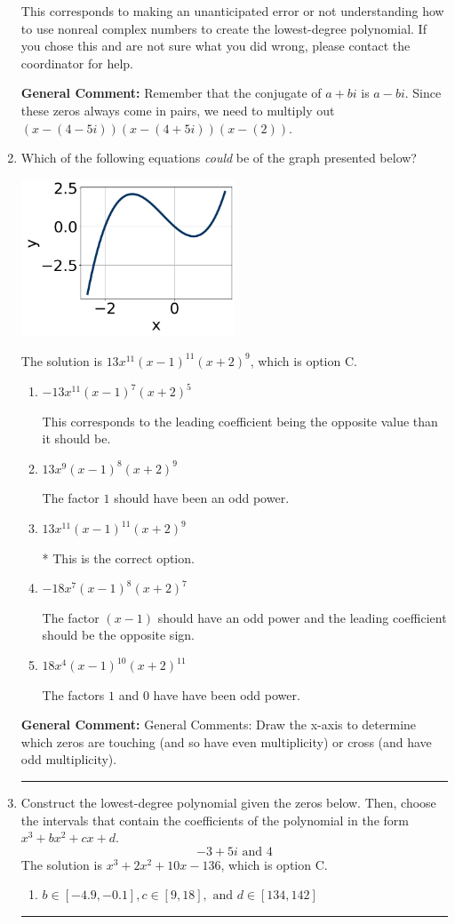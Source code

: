 \documentclass{extbook}[14pt]
\newcommand{\litem}[1]{\item #1

\rule{\textwidth}{0.4pt}}
\begin{document}
\begin{enumerate}
{\begin{enumerate}[label=\Alph*.]
This corresponds to making an unanticipated error or not understanding how to use nonreal complex numbers to create the lowest-degree polynomial. If you chose this and are not sure what you did wrong, please contact the coordinator for help.
\end{enumerate}

\textbf{General Comment:} Remember that the conjugate of $a+bi$ is $a-bi$. Since these zeros always come in pairs, we need to multiply out $(x-(4 - 5 i))(x-(4 + 5 i))(x-(2))$.
}
\litem{
Which of the following equations \textit{could} be of the graph presented below?

\begin{center}
    \includegraphics[width=0.5\textwidth]{../Figures/polyGraphToFunctionA.png}
\end{center}


The solution is \( 13x^{11} (x - 1)^{11} (x + 2)^{9} \), which is option C.\begin{enumerate}[label=\Alph*.]
\item \( -13x^{11} (x - 1)^{7} (x + 2)^{5} \)

This corresponds to the leading coefficient being the opposite value than it should be.
\item \( 13x^{9} (x - 1)^{8} (x + 2)^{9} \)

The factor $1$ should have been an odd power.
\item \( 13x^{11} (x - 1)^{11} (x + 2)^{9} \)

* This is the correct option.
\item \( -18x^{7} (x - 1)^{8} (x + 2)^{7} \)

The factor $(x - 1)$ should have an odd power and the leading coefficient should be the opposite sign.
\item \( 18x^{4} (x - 1)^{10} (x + 2)^{11} \)

The factors $1$ and $0$ have have been odd power.
\end{enumerate}

\textbf{General Comment:} General Comments: Draw the x-axis to determine which zeros are touching (and so have even multiplicity) or cross (and have odd multiplicity).
}
\litem{
Construct the lowest-degree polynomial given the zeros below. Then, choose the intervals that contain the coefficients of the polynomial in the form $x^3+bx^2+cx+d$.
\[ -3 + 5 i \text{ and } 4 \]The solution is \( x^{3} +2 x^{2} +10 x -136 \), which is option C.\begin{enumerate}[label=\Alph*.]
\item \( b \in [-4.9, -0.1], c \in [9, 18], \text{ and } d \in [134, 142] \)


\end{enumerate}}
\end{enumerate}
\end{document}
